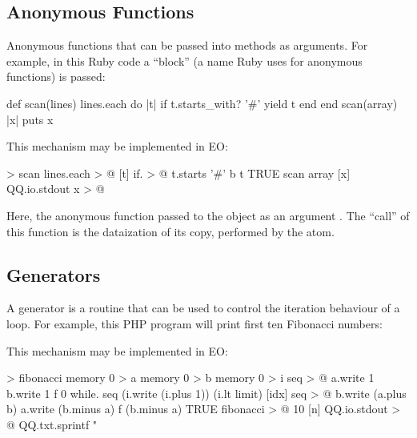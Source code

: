 \documentclass[sigplan,11pt,nonacm,natbib=false]{acmart}
\begin{document}
\subsection{Anonymous Functions}
\label{sec:blocks}

Anonymous functions that can be passed into methods as arguments. For example, in this Ruby code a ``block'' (a name Ruby uses for anonymous functions) is passed:

\begin{ffcode}
def scan(lines)
  lines.each do |t|
    if t.starts_with? '#' yield t
  end
end
scan(array) { |x| puts x }
\end{ffcode}

This mechanism may be implemented in EO:

\begin{ffcode}
[lines b] > scan
  lines.each > @
    [t]
      if. > @
        t.starts '#'
        b t
        TRUE
scan
  array
  [x]
    QQ.io.stdout x > @
\end{ffcode}

Here, the anonymous function passed to the object  as an argument . The ``call'' of this function is the dataization of its copy, performed by the  atom.

\subsection{Generators}
\label{sec:generators}

A generator is a routine that can be used to control the iteration behaviour of a loop. For example, this PHP program will print first ten Fibonacci numbers:


This mechanism may be implemented in EO:

\begin{ffcode}
[limit f] > fibonacci
  memory 0 > a
  memory 0 > b
  memory 0 > i
  seq > @
    a.write 1
    b.write 1
    f 0
    while.
      seq (i.write (i.plus 1)) (i.lt limit)
      [idx]
        seq > @
          b.write (a.plus b)
          a.write (b.minus a)
          f (b.minus a)
    TRUE
fibonacci > @
  10
  [n]
    QQ.io.stdout > @
      QQ.txt.sprintf "%
\end{ffcode}
\end{document}

